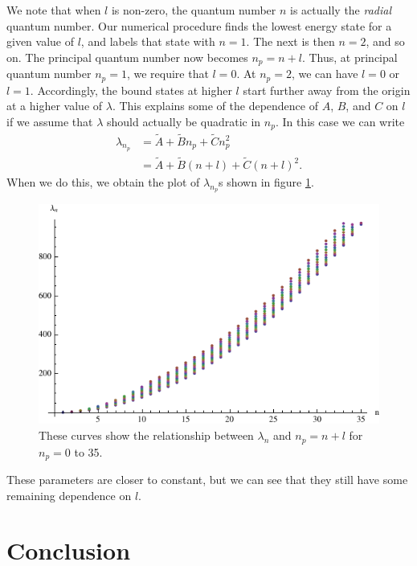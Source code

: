 \documentclass[12pt,twoside]{reedthesis}
\newcommand{\eq}[1]{\begin{align}#1\end{align}}
\begin{document}
We note that when $l$ is non-zero, the quantum number $n$ is actually the \emph{radial} quantum number. Our numerical procedure finds the lowest energy state for a given value of $l$, and labels that state with $n = 1$. The next is then $n = 2$, and so on. The principal quantum number now becomes $n_p = n + l$. Thus, at principal quantum number $n_p = 1$, we require that $l = 0$. At $n_p = 2$, we can have $l = 0$ or $l = 1$. Accordingly, the bound states at higher $l$ start further away from the origin at a higher value of $\lambda$. 
This explains some of the dependence of $A$, $B$, and $C$ on $l$ if we assume that $\lambda$ should actually be quadratic in $n_p$. In this case we can write
\eq{
\lambda_{n_p} &= \tilde{A} + \tilde{B} n_p + \tilde{C} n_p^2 \\
&= \tilde{A} + \tilde{B} (n + l) + \tilde{C} (n + l)^2\mbox{.}
}
When we do this, we obtain the plot of $\lambda_{n_p}$s shown in figure \ref{fig:alllcs-principal}.

\begin{figure}[h]
\centering
\includegraphics{Figures/alllcs-principal}
\caption[Plots of $\lambda_n$ versus $n + l$ for $l = 0$ to $10$]{These curves show the relationship between $\lambda_n$ and $n_p = n + l$ for $n_p = 0$ to 35.}
\label{fig:alllcs-principal}
\end{figure}

These parameters are closer to constant, but we can see that they still have some remaining dependence on $l$.


%
%
\chapter*{Conclusion}
	\setcounter{chapter}{4}
	\setcounter{section}{0}
\end{document}
